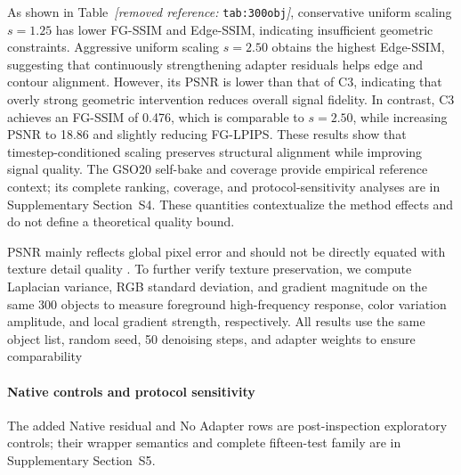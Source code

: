 \documentclass[times,twocolumn,final]{elsarticle}
\providecommand{\DIFadd}[1]{{\protect\color{blue} \sf #1}} %
\providecommand{\DIFdel}[1]{{\protect\color{red} \scriptsize #1}} %
\providecommand{\DIFaddbegin}{} %
\providecommand{\DIFaddend}{} %
\providecommand{\DIFdelbegin}{} %
\providecommand{\DIFdelend}{} %
\begin{document}
\DIFdelbegin \DIFdel{As shown in Table~\textit{[removed reference: }\texttt{tab:300obj}\textit{]}, conservative uniform scaling $s = 1.25$ has lower FG-SSIM and Edge-SSIM, indicating insufficient geometric constraints.
Aggressive uniform scaling $s = 2.50$ obtains the highest Edge-SSIM, suggesting that continuously strengthening adapter residuals helps edge and contour alignment. However, its PSNR is lower than that of C3, indicating that overly strong geometric intervention reduces overall signal fidelity. In contrast, C3 achieves an FG-SSIM of 0.476, which is comparable to $s = 2.50$, while increasing PSNR to 18.86 and slightly reducing FG-LPIPS. These results show that timestep-conditioned scaling preserves structural alignment while improving signal quality.
}\DIFdelend \DIFaddbegin \DIFadd{The GSO20 self-bake and coverage provide empirical reference context; its complete ranking, coverage, and protocol-sensitivity analyses are in Supplementary Section~S4. These quantities contextualize the method effects and do not define a theoretical quality bound.
}\DIFaddend

\DIFdelbegin \DIFdel{PSNR mainly reflects global pixel error and should not be directly equated with texture detail quality . To further verify texture preservation, we compute Laplacian variance, RGB standard deviation, and gradient magnitude on the same 300 objects to measure foreground high-frequency response, color variation amplitude, and local gradient strength, respectively. All results use the same object list, random seed, 50 denoising steps, and adapter weights to ensure comparability}\DIFdelend \DIFaddbegin \paragraph{Native controls and protocol sensitivity}
\DIFadd{The added Native residual and No Adapter rows are post-inspection exploratory controls; their wrapper semantics and complete fifteen-test family are in Supplementary Section~S5}\DIFaddend .
\end{document}
